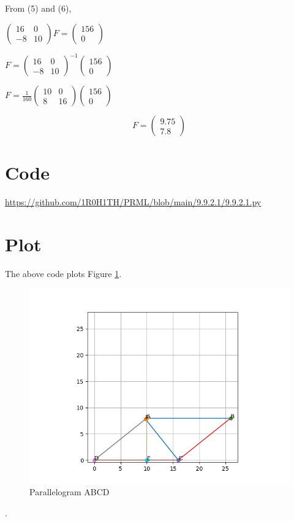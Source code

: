 \documentclass[letterpaper,12pt]{article}
\begin{document}
\clearpage

From (5) and (6),
\begin{center}
    $\begin{pmatrix}16 & 0 \\ -8 & 10 \end{pmatrix}F = \begin{pmatrix} 156 \\ 0 \end{pmatrix}$
\end{center}
\begin{center}
    $F = \begin{pmatrix}16 & 0 \\ -8 & 10 \end{pmatrix}^{-1}\begin{pmatrix} 156 \\ 0 \end{pmatrix}$
\end{center}
\begin{center}
    $F = \frac{1}{160}\begin{pmatrix}10 & 0 \\ 8 & 16 \end{pmatrix}\begin{pmatrix} 156 \\ 0 \end{pmatrix}$
\end{center}
\begin{equation}
    F = \begin{pmatrix}9.75 \\ 7.8\end{pmatrix}
\end{equation}

\section{Code}
\url{https://github.com/1R0H1TH/PRML/blob/main/9.9.2.1/9.9.2.1.py}

\section{Plot}
The above code plots Figure \ref{fig:fig2}.
\begin{figure}[!ht]
\centering
\includegraphics[width=0.75\columnwidth]{Figure_1.png}
\caption{Parallelogram ABCD}
\label{fig:fig2}
\end{figure}.
\end{document}
